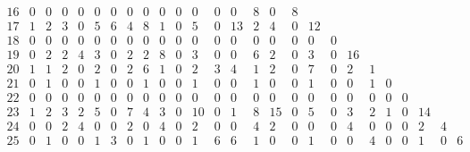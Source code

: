 \begin{landscape}
\[\begin{array}{c|ccccccccccccccccccccccccc}
16&  0&  0&  0&  0&  0&  0&  0&  0&  0&  0&  0&  0&  0&  8&  0&  8&   &   &   &   &   &   &   &   &   \\
17&  1&  2&  3&  0&  5&  6&  4&  8&  1&  0&  5&  0& 13&  2&  4&  0& 12&   &   &   &   &   &   &   &   \\
18&  0&  0&  0&  0&  0&  0&  0&  0&  0&  0&  0&  0&  0&  0&  0&  0&  0&  0&   &   &   &   &   &   &   \\
19&  0&  2&  2&  4&  3&  0&  2&  2&  8&  0&  3&  0&  0&  6&  2&  0&  3&  0& 16&   &   &   &   &   &   \\
20&  1&  1&  2&  0&  2&  0&  2&  6&  1&  0&  2&  3&  4&  1&  2&  0&  7&  0&  2&  1&   &   &   &   &   \\
21&  0&  1&  0&  0&  1&  0&  0&  1&  0&  0&  1&  0&  0&  1&  0&  0&  1&  0&  0&  1&  0&   &   &   &   \\
22&  0&  0&  0&  0&  0&  0&  0&  0&  0&  0&  0&  0&  0&  0&  0&  0&  0&  0&  0&  0&  0&  0&   &   &   \\
23&  1&  2&  3&  2&  5&  0&  7&  4&  3&  0& 10&  0&  1&  8& 15&  0&  5&  0&  3&  2&  1&  0& 14&   &   \\
24&  0&  0&  2&  4&  0&  0&  2&  0&  4&  0&  2&  0&  0&  4&  2&  0&  0&  0&  4&  0&  0&  0&  2&  4&   \\
25&  0&  1&  0&  0&  1&  3&  0&  1&  0&  0&  1&  6&  6&  1&  0&  0&  1&  0&  0&  4&  0&  0&  1&  0&  6\\
\end{array}
\]


\end{landscape}
